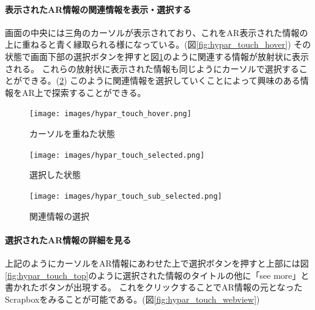 \paragraph*{表示されたAR情報の関連情報を表示・選択する}
画面の中央には三角のカーソルが表示されており、これをAR表示された情報の上に重ねると青く縁取られる様になっている。(図\ref{fig:hypar_touch_hover})
その状態で画面下部の選択ボタンを押すと図\ref{fig:hypar_touch_selected}のように関連する情報が放射状に表示される。
これらの放射状に表示された情報も同じようにカーソルで選択することができる。(\ref{fig:hypar_touch_sub_selected})
このように関連情報を選択していくことによって興味のある情報をAR上で探索することができる。

\begin{figure}[htbp]
  \begin{minipage}{0.5\hsize}
    \centering
    \texttt{[image: images/hypar\_touch\_hover.png]}
    \caption{カーソルを重ねた状態} \label{fig:hypar_touch_hover}
  \end{minipage}
  \begin{minipage}{0.5\hsize}
    \centering
    \texttt{[image: images/hypar\_touch\_selected.png]}
    \caption{選択した状態} \label{fig:hypar_touch_selected}
  \end{minipage}
\end{figure}

\begin{figure}[htbp]
    \centering
    \texttt{[image: images/hypar\_touch\_sub\_selected.png]}
    \caption{関連情報の選択} \label{fig:hypar_touch_sub_selected}
\end{figure}

\paragraph*{選択されたAR情報の詳細を見る}
上記のようにカーソルをAR情報にあわせた上で選択ボタンを押すと上部には図\ref{fig:hypar_touch_top}のように選択された情報のタイトルの他に「see more」と書かれたボタンが出現する。
これをクリックすることでAR情報の元となったScrapboxをみることが可能である。(図\ref{fig:hypar_touch_webview})

